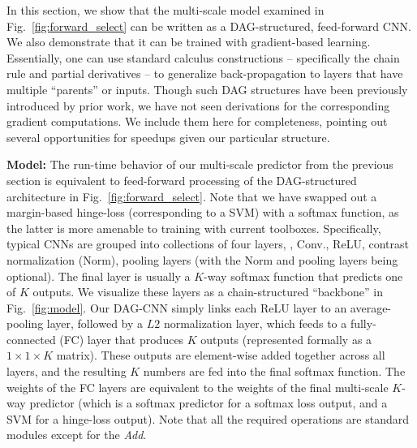 \documentclass[10pt,twocolumn,letterpaper]{article}
\begin{document}
In this section, we show that the multi-scale model examined in Fig.~\ref{fig:forward_select} can be written as a DAG-structured, feed-forward CNN. We also demonstrate that it can be trained with gradient-based learning. Essentially, one can use standard calculus constructions -- specifically the chain rule and partial derivatives -- to generalize back-propagation to layers that have multiple ``parents'' or inputs. Though such DAG structures have been previously introduced by prior work, we have not seen derivations for the corresponding gradient computations. We include them here for completeness, pointing out several opportunities for speedups given our particular structure.

{\bf Model:} The run-time behavior of our multi-scale predictor from the previous section is equivalent to feed-forward processing of the DAG-structured architecture in Fig.~\ref{fig:forward_select}. Note that we have swapped out a margin-based hinge-loss (corresponding to a SVM) with a softmax function, as the latter is more amenable to training with current toolboxes. Specifically, typical CNNs are grouped into collections of four layers, \ie, Conv., ReLU, contrast normalization (Norm), pooling layers (with the Norm and pooling layers being optional). The final layer is usually a $K$-way softmax function that predicts one of $K$ outputs. We visualize these layers as a chain-structured ``backbone'' in Fig.~\ref{fig:model}. Our DAG-CNN simply links each ReLU layer to an average-pooling layer, followed by a $L2$ normalization layer, which feeds to a fully-connected (FC) layer that produces $K$ outputs (represented formally as a $1 \times 1 \times K$ matrix). These outputs are element-wise added together across all layers, and the resulting $K$ numbers are fed into the final softmax function. The weights of the FC layers are equivalent to the weights of the final multi-scale $K$-way predictor (which is a softmax predictor for a softmax loss output, and a SVM for a hinge-loss output). Note that all the required operations are standard modules except for the \textit{Add}.



\end{document}
